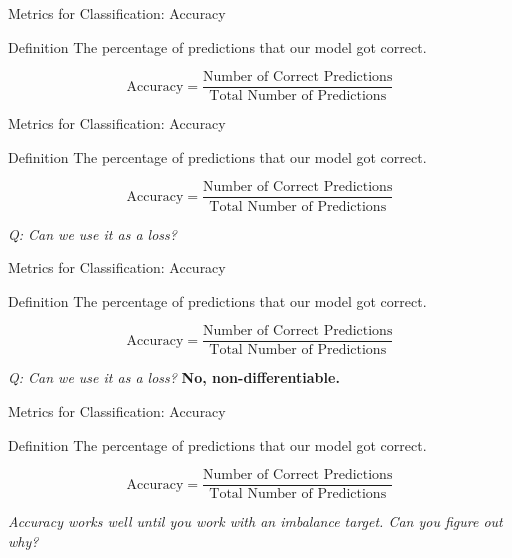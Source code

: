 \begin{frame}{Metrics for Classification: Accuracy}
    \centering
    \begin{block}{Definition}
        The percentage of predictions that our model got correct.
    \end{block}
        
    \[
        \text{Accuracy} = \frac{\text{Number of Correct Predictions}}{\text{Total Number of Predictions}}
    \]
\end{frame}

\begin{frame}{Metrics for Classification: Accuracy}
    \centering
    \begin{block}{Definition}
        The percentage of predictions that our model got correct.
    \end{block}
        
    \[
        \text{Accuracy} = \frac{\text{Number of Correct Predictions}}{\text{Total Number of Predictions}}
    \]

    \small \textit{Q: Can we use it as a loss?}
\end{frame}

\begin{frame}{Metrics for Classification: Accuracy}
    \centering
    \begin{block}{Definition}
        The percentage of predictions that our model got correct.
    \end{block}
        
    \[
        \text{Accuracy} = \frac{\text{Number of Correct Predictions}}{\text{Total Number of Predictions}}
    \]

    \small \textit{Q: Can we use it as a loss? }\textbf{No, non-differentiable.}
\end{frame}

\begin{frame}{Metrics for Classification: Accuracy}
    \centering
    \begin{block}{Definition}
        The percentage of predictions that our model got correct.
    \end{block}
        
    \[
        \text{Accuracy} = \frac{\text{Number of Correct Predictions}}{\text{Total Number of Predictions}}
    \]

    \small \textit{Accuracy works well until you work with an imbalance target. Can you figure out why?}
\end{frame}


